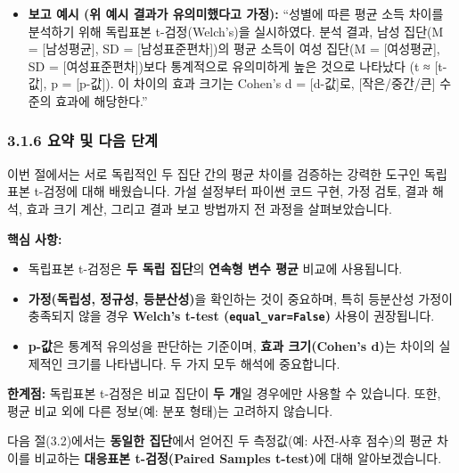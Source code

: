 \documentclass[
  letterpaper,
]{book}
\providecommand{\tightlist}{%
  \setlength{\itemsep}{0pt}\setlength{\parskip}{0pt}}
\begin{document}
\begin{itemize}
\tightlist
\item
  \textbf{보고 예시 (위 예시 결과가 유의미했다고 가정):} ``성별에 따른
  평균 소득 차이를 분석하기 위해 독립표본 t-검정(Welch's)을 실시하였다.
  분석 결과, 남성 집단(M = {[}남성평균{]}, SD = {[}남성표준편차{]})의
  평균 소득이 여성 집단(M = {[}여성평균{]}, SD = {[}여성표준편차{]})보다
  통계적으로 유의미하게 높은 것으로 나타났다 (t ≈ {[}t-값{]}, p =
  {[}p-값{]}). 이 차이의 효과 크기는 Cohen's d = {[}d-값{]}로,
  {[}작은/중간/큰{]} 수준의 효과에 해당한다.''
\end{itemize}

\subsection{3.1.6 요약 및 다음
단계}\label{uxc694uxc57d-uxbc0f-uxb2e4uxc74c-uxb2e8uxacc4}

이번 절에서는 서로 독립적인 두 집단 간의 평균 차이를 검증하는 강력한
도구인 독립표본 t-검정에 대해 배웠습니다. 가설 설정부터 파이썬 코드
구현, 가정 검토, 결과 해석, 효과 크기 계산, 그리고 결과 보고 방법까지 전
과정을 살펴보았습니다.

\textbf{핵심 사항:}

\begin{itemize}
\tightlist
\item
  독립표본 t-검정은 \textbf{두 독립 집단}의 \textbf{연속형 변수 평균}
  비교에 사용됩니다.
\item
  \textbf{가정(독립성, 정규성, 등분산성)}을 확인하는 것이 중요하며, 특히
  등분산성 가정이 충족되지 않을 경우 \textbf{Welch's t-test
  (\texttt{equal\_var=False})} 사용이 권장됩니다.
\item
  \textbf{p-값}은 통계적 유의성을 판단하는 기준이며, \textbf{효과
  크기(Cohen's d)}는 차이의 실제적인 크기를 나타냅니다. 두 가지 모두
  해석에 중요합니다.
\end{itemize}

\textbf{한계점:} 독립표본 t-검정은 비교 집단이 \textbf{두 개}일 경우에만
사용할 수 있습니다. 또한, 평균 비교 외에 다른 정보(예: 분포 형태)는
고려하지 않습니다.

다음 절(3.2)에서는 \textbf{동일한 집단}에서 얻어진 두 측정값(예:
사전-사후 점수)의 평균 차이를 비교하는 \textbf{대응표본 t-검정(Paired
Samples t-test)}에 대해 알아보겠습니다.

\chapter{}\label{section}
\end{document}
